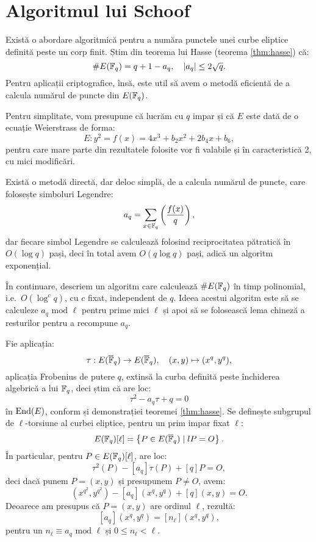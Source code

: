 
\chapter{Algoritmul lui Schoof}

Există o abordare algoritmică pentru a număra punctele unei curbe
eliptice definită peste un corp finit. Știm din teorema lui Hasse
(teorema \ref{thm:hasse}) că:
\[
    \# E(\mathbb{F}_q) = q + 1 - a_q, \quad |a_q| \leq 2 \sqrt{q}.
\]
Pentru aplicații criptografice, însă, este util să avem o metodă
eficientă de a calcula numărul de puncte din $ E(\mathbb{F}_q) $.

Pentru simplitate, vom presupune că lucrăm cu $ q $ impar și
că $ E $ este dată de o ecuație Weierstrass de forma:
\[
    E: y^2 = f(x) = 4x^3 + b_2x^2 + 2b_4x + b_6,
\]
pentru care mare parte din rezultatele folosite vor fi valabile
și în caracteristică 2, cu mici modificări.

Există o metodă directă, dar deloc simplă, de a calcula numărul de
puncte, care folosește simboluri Legendre:
\[
    a_q = \sum_{x \in \mathbb{F}_q} \left( \dfrac{f(x)}{q} \right),
\]
dar fiecare simbol Legendre se calculează folosind reciprocitatea
pătratică în $ O(\log q) $ pași, deci în total avem $ O(q \log q) $
pași, adică un algoritm exponențial.

În continuare, descriem un algoritm care calculează $ \# E(\mathbb{F}_q) $ în
timp polinomial, i.e.\ $ O(\log^c q) $, cu $ c $ fixat, independent de $ q $.
Ideea acestui algoritm este să se calculeze $ a_q \text{ mod } \ell $
pentru prime mici $ \ell $ și apoi să se folosească lema chineză a resturilor
pentru a recompune $ a_q $.

Fie aplicația:
\[
    \tau : E(\overline{\mathbb{F}}_q) \to E(\overline{\mathbb{F}}_q), \quad (x, y) \mapsto (x^q, y^q),
\]
aplicația Frobenius de putere $ q $, extinsă la curba definită peste închiderea
algebrică a lui $ \mathbb{F}_q $, deci știm că are loc:
\[
    \tau^2 - a_q \tau + q = 0
\]
în $ \mathrm{End}(E) $, conform și demonstrației teoremei \ref{thm:hasse}.
Se definește subgrupul de $ \ell $-torsiune al curbei eliptice, pentru
un prim impar fixat $ \ell $:
\[
  E(\mathbb{F}_q)[\ell] = \left\{ P \in E(\overline{\mathbb{F}}_q) \mid lP = O \right\}.
\]
În particular, pentru $ P \in E(\mathbb{F}_q)[\ell] $, are loc:
\[
    \tau^2(P) - [a_q]\tau(P) + [q]P = O,
\]
deci dacă punem $ P = (x, y) $ și presupunem $ P \neq O $, avem:
\[
    (x^{q^2}, y^{q^2}) - [a_q](x^q, y^q) + [q](x, y) = O.
\]
Deoarece am presupus că $ P = (x, y) $ are ordinul $ \ell $, rezultă:
\[
    [a_q](x^q, y^q) = [n_\ell](x^q, y^q),
\]
pentru un $ n_\ell \equiv a_q \text{ mod } \ell $ și $ 0 \leq n_\ell < \ell $.

